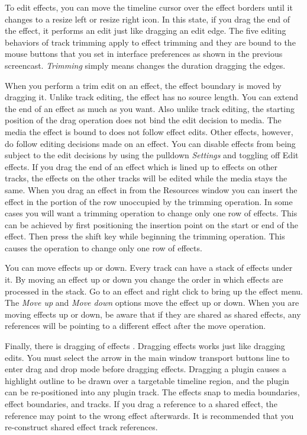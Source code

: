To edit effects, you can move the timeline cursor over the effect borders until it changes to a resize left or resize right icon. In this state, if you drag the end of the effect, it performs an edit just like dragging an edit edge. The five editing behaviors of track trimming  apply to effect trimming and they are bound to the mouse buttons that you set in interface preferences as shown in the previous screencast. \textit{Trimming} simply means changes the duration dragging the edges.

When you perform a trim edit on an effect, the effect boundary is moved by dragging it. Unlike track editing, the effect has no source length. You can extend the end of an effect as much as you want. Also unlike track editing, the starting position of the drag operation does not bind the edit decision to media. The media the effect is bound to does not follow effect edits. Other effects, however, do follow editing decisions made on an effect. You can disable effects from being subject to the edit decisions by using the pulldown \textit{Settings} and toggling off Edit effects. If you drag the end of an effect which is lined up to effects on other tracks, the effects on the other tracks will be edited while the media stays the same. When you drag an effect in from the Resources window you can insert the effect in the portion of the row unoccupied by the trimming operation. In some cases you will want a trimming operation to change only one row of effects. This can be achieved by first positioning the insertion point on the start or end of the effect. Then press the shift key while beginning the trimming operation. This causes the operation to change only one row of effects.

You can move effects up or down. Every track can have a stack of effects under it. By moving an effect up or down you change the order in which effects are processed in the stack. Go to an effect and right click  to bring up the effect menu. The \textit{Move up} and \textit{Move down} options move the effect up or down. When you are moving effects up or down, be aware that if they are shared as shared effects, any references will be pointing to a different effect after the move operation.

Finally, there is dragging of effects . Dragging effects works just like dragging edits. You must select the arrow in the main window transport buttons line to enter drag and drop mode before dragging effects. Dragging a plugin causes a highlight outline to be drawn over a targetable timeline region, and the plugin can be re-positioned into any plugin track.  The effects snap to media boundaries, effect boundaries, and tracks. If you drag a reference to a shared effect, the reference may point to the wrong effect afterwards.  It is recommended that you re-construct shared effect track references.

